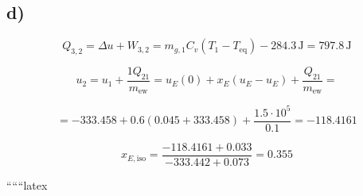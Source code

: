 

\subsection*{d)}
\[
Q_{3,2} = \Delta u + W_{3,2} = m_{g,1} C_v (T_{1} - T_{\text{eq}}) - 284.3 \, \text{J} = 797.8 \, \text{J}
\]

\[
u_{2} = u_{1} + \frac{1 Q_{21}}{m_{\text{ew}}} = u_{E}(0) + x_{E}(u_{E} - u_{E}) + \frac{Q_{21}}{m_{\text{ew}}} =
\]

\[
= -333.458 + 0.6 (0.045 + 333.458) + \frac{1.5 \cdot 10^5}{0.1} = -118.4161
\]

\[
x_{E, \text{iso}} = \frac{-118.4161 + 0.033}{-333.442 + 0.073} = 0.355
\]

``````latex